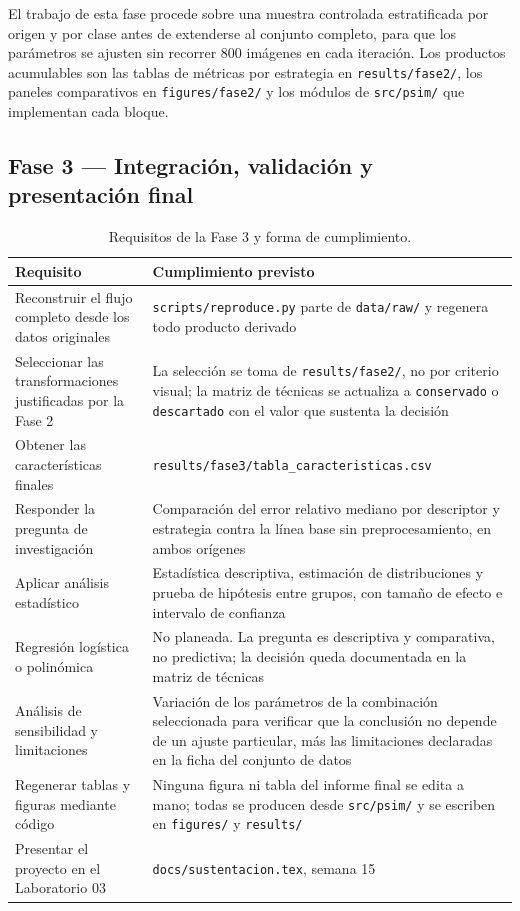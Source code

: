 \documentclass[12pt,a4paper]{article}
\begin{document}
El trabajo de esta fase procede sobre una muestra controlada estratificada por
origen y por clase antes de extenderse al conjunto completo, para que los
parámetros se ajusten sin recorrer 800 imágenes en cada iteración. Los productos
acumulables son las tablas de métricas por estrategia en \texttt{results/fase2/},
los paneles comparativos en \texttt{figures/fase2/} y los módulos de
\texttt{src/psim/} que implementan cada bloque.

\subsection{Fase 3 — Integración, validación y presentación final}

\begin{table}[H]
\centering
\caption{Requisitos de la Fase 3 y forma de cumplimiento.}
\small
\begin{tabular}{@{}p{5.6cm}p{7.9cm}@{}}
\toprule
\textbf{Requisito} & \textbf{Cumplimiento previsto} \\
\midrule
Reconstruir el flujo completo desde los datos originales & \texttt{scripts/reproduce.py} parte de \texttt{data/raw/} y regenera todo producto derivado \\
Seleccionar las transformaciones justificadas por la Fase 2 & La selección se toma de \texttt{results/fase2/}, no por criterio visual; la matriz de técnicas se actualiza a \texttt{conservado} o \texttt{descartado} con el valor que sustenta la decisión \\
Obtener las características finales & \texttt{results/fase3/tabla\_caracteristicas.csv} \\
Responder la pregunta de investigación & Comparación del error relativo mediano por descriptor y estrategia contra la línea base sin preprocesamiento, en ambos orígenes \\
Aplicar análisis estadístico & Estadística descriptiva, estimación de distribuciones y prueba de hipótesis entre grupos, con tamaño de efecto e intervalo de confianza \\
Regresión logística o polinómica & No planeada. La pregunta es descriptiva y comparativa, no predictiva; la decisión queda documentada en la matriz de técnicas \\
Análisis de sensibilidad y limitaciones & Variación de los parámetros de la combinación seleccionada para verificar que la conclusión no depende de un ajuste particular, más las limitaciones declaradas en la ficha del conjunto de datos \\
Regenerar tablas y figuras mediante código & Ninguna figura ni tabla del informe final se edita a mano; todas se producen desde \texttt{src/psim/} y se escriben en \texttt{figures/} y \texttt{results/} \\
Presentar el proyecto en el Laboratorio 03 & \texttt{docs/sustentacion.tex}, semana 15 \\
\bottomrule
\end{tabular}
\end{table}
\end{document}
